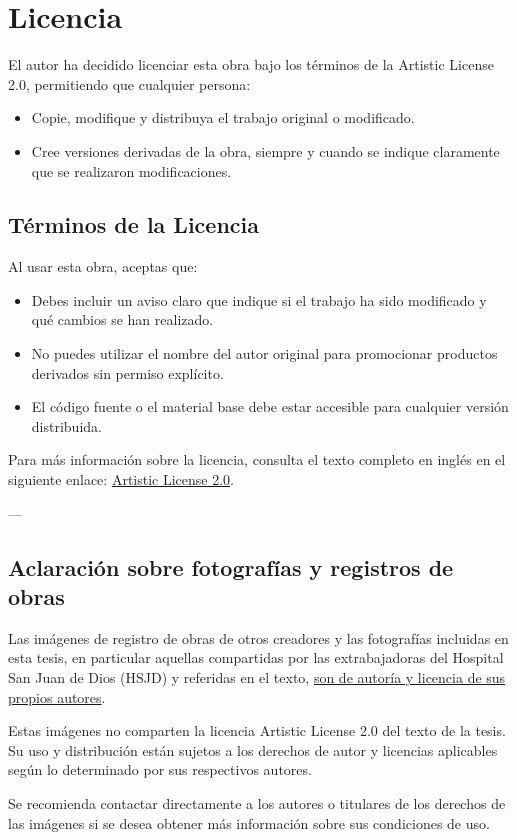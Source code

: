 \section*{Licencia}

El autor ha decidido licenciar esta obra bajo los términos de la Artistic License 2.0, permitiendo que cualquier persona:
\begin{itemize}
    \item Copie, modifique y distribuya el trabajo original o modificado.
    \item Cree versiones derivadas de la obra, siempre y cuando se indique claramente que se realizaron modificaciones.
\end{itemize}

\subsection*{Términos de la Licencia}

Al usar esta obra, aceptas que:

\begin{itemize}
    \item Debes incluir un aviso claro que indique si el trabajo ha sido modificado y qué cambios se han realizado.
    \item No puedes utilizar el nombre del autor original para promocionar productos derivados sin permiso explícito.
    \item El código fuente o el material base debe estar accesible para cualquier versión distribuida.
\end{itemize}

Para más información sobre la licencia, consulta el texto completo en inglés en el siguiente enlace: \href{https://opensource.org/licenses/Artistic-2.0}{Artistic License 2.0}.

---

\subsection*{Aclaración sobre fotografías y registros de obras}

Las imágenes de registro de obras de otros creadores y las fotografías incluidas en esta tesis, en particular aquellas compartidas por las extrabajadoras del Hospital San Juan de Dios (HSJD) y referidas en el texto, \underline{son de autoría y licencia de sus propios autores}.

Estas imágenes no comparten la licencia Artistic License 2.0 del texto de la tesis. Su uso y distribución están sujetos a los derechos de autor y licencias aplicables según lo determinado por sus respectivos autores.

Se recomienda contactar directamente a los autores o titulares de los derechos de las imágenes si se desea obtener más información sobre sus condiciones de uso.

